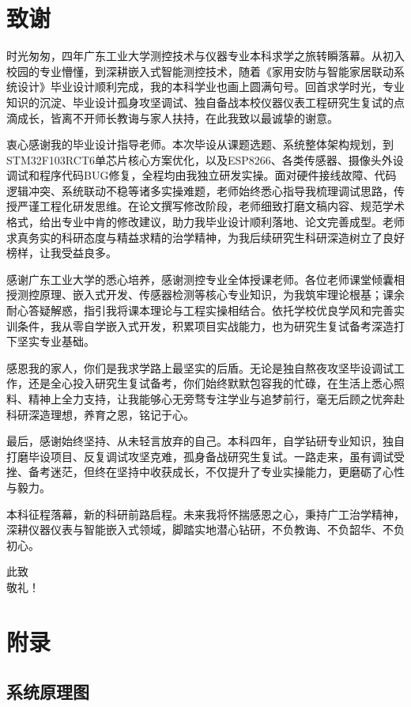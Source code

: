 \documentclass[UTF8,12pt,a4paper,oneside]{ctexbook}
\numberwithin{equation}{chapter}
\begin{document}
\chapter*{致谢}
时光匆匆，四年广东工业大学测控技术与仪器专业本科求学之旅转瞬落幕。从初入校园的专业懵懂，到深耕嵌入式智能测控技术，随着《家用安防与智能家居联动系统设计》毕业设计顺利完成，我的本科学业也画上圆满句号。回首求学时光，专业知识的沉淀、毕业设计孤身攻坚调试、独自备战本校仪器仪表工程研究生复试的点滴成长，皆离不开师长教诲与家人扶持，在此我致以最诚挚的谢意。

衷心感谢我的毕业设计指导老师。本次毕设从课题选题、系统整体架构规划，到STM32F103RCT6单芯片核心方案优化，以及ESP8266、各类传感器、摄像头外设调试和程序代码BUG修复，全程均由我独立研发实操。面对硬件接线故障、代码逻辑冲突、系统联动不稳等诸多实操难题，老师始终悉心指导我梳理调试思路，传授严谨工程化研发思维。在论文撰写修改阶段，老师细致打磨文稿内容、规范学术格式，给出专业中肯的修改建议，助力我毕业设计顺利落地、论文完善成型。老师求真务实的科研态度与精益求精的治学精神，为我后续研究生科研深造树立了良好榜样，让我受益良多。

感谢广东工业大学的悉心培养，感谢测控专业全体授课老师。各位老师课堂倾囊相授测控原理、嵌入式开发、传感器检测等核心专业知识，为我筑牢理论根基；课余耐心答疑解惑，指引我将课本理论与工程实操相结合。依托学校优良学风和完善实训条件，我从零自学嵌入式开发，积累项目实战能力，也为研究生复试备考深造打下坚实专业基础。

感恩我的家人，你们是我求学路上最坚实的后盾。无论是独自熬夜攻坚毕设调试工作，还是全心投入研究生复试备考，你们始终默默包容我的忙碌，在生活上悉心照料、精神上全力支持，让我能够心无旁骛专注学业与追梦前行，毫无后顾之忧奔赴科研深造理想，养育之恩，铭记于心。

最后，感谢始终坚持、从未轻言放弃的自己。本科四年，自学钻研专业知识，独自打磨毕设项目、反复调试攻坚克难，孤身备战研究生复试。一路走来，虽有调试受挫、备考迷茫，但终在坚持中收获成长，不仅提升了专业实操能力，更磨砺了心性与毅力。

本科征程落幕，新的科研前路启程。未来我将怀揣感恩之心，秉持广工治学精神，深耕仪器仪表与智能嵌入式领域，脚踏实地潜心钻研，不负教诲、不负韶华、不负初心。

此致\\
敬礼！

\appendix
\chapter{附录}
\section{系统原理图}
\end{document}
